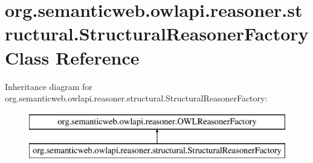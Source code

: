 \hypertarget{classorg_1_1semanticweb_1_1owlapi_1_1reasoner_1_1structural_1_1_structural_reasoner_factory}{\section{org.\-semanticweb.\-owlapi.\-reasoner.\-structural.\-Structural\-Reasoner\-Factory Class Reference}
\label{classorg_1_1semanticweb_1_1owlapi_1_1reasoner_1_1structural_1_1_structural_reasoner_factory}
}
Inheritance diagram for org.\-semanticweb.\-owlapi.\-reasoner.\-structural.\-Structural\-Reasoner\-Factory\-:\begin{figure}[H]
\begin{center}
\leavevmode
\includegraphics[height=2.000000cm]{classorg_1_1semanticweb_1_1owlapi_1_1reasoner_1_1structural_1_1_structural_reasoner_factory}
\end{center}
\end{figure}
